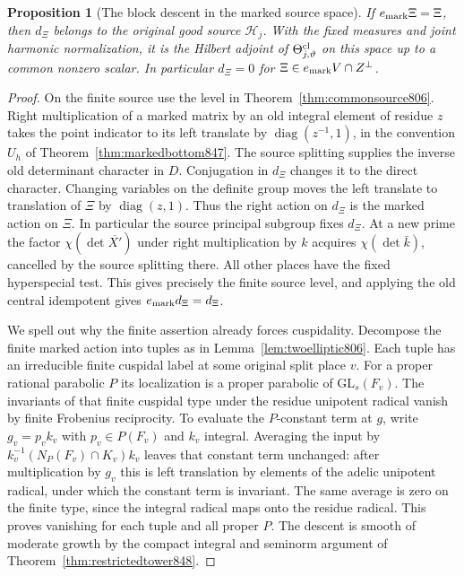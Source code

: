 \documentclass[a4paper,11pt]{article}
\newtheorem{proposition}{Proposition}[section]
\theoremstyle{definition}
\theoremstyle{remark}
\numberwithin{equation}{section}
\begin{document}
\begin{proposition}[The block descent in the marked source space]
\leavevmode\label{prop:actualadjoint849}
If \(e_{\rm mark}\Xi=\Xi\), then \(d_\Xi\) belongs to the
original good source \(\mathcal H_j\). With the fixed measures
and joint harmonic normalization, it is the Hilbert adjoint of
\(\Theta^{\rm cl}_{j,\vartheta}\) on this space up to a common
nonzero scalar. In particular \(d_\Xi=0\) for
\(\Xi\in e_{\rm mark}V\cap Z^\perp\).
\end{proposition}
\begin{proof}
On the finite source use the level in
Theorem~\ref{thm:commonsource806}. Right multiplication of a
marked matrix by an old integral element of residue \(z\)
takes the point indicator to its left translate by
\(\operatorname{diag}(z^{-1},1)\), in the convention \(U_h\)
of Theorem~\ref{thm:markedbottom847}. The source splitting
supplies the inverse old determinant character in \(D\).
Conjugation in \(d_\Xi\) changes it to the direct character.
Changing variables on the definite group moves the left
translate to translation of \(\Xi\) by
\(\operatorname{diag}(z,1)\). Thus the right action on
\(d_\Xi\) is the marked action on \(\Xi\). In particular the
source principal subgroup fixes \(d_\Xi\). At a new prime the
factor \(\chi(\det\overline{X'})\) under right multiplication
by \(k\) acquires \(\chi(\det\bar k)\), cancelled by the
source splitting there. All other places have the fixed
hyperspecial test. This gives precisely the finite source
level, and applying the old central idempotent gives
\(e_{\rm mark}d_\Xi=d_\Xi\).

We spell out why the finite assertion already forces
cuspidality. Decompose the finite marked action into tuples
as in Lemma~\ref{lem:twoelliptic806}. Each tuple has an
irreducible finite cuspidal label at some original split
place \(v\). For a proper rational parabolic \(P\) its
localization is a proper parabolic of \(\mathrm{GL}_s(F_v)\).
The invariants of that finite cuspidal type under the residue
unipotent radical vanish by finite Frobenius reciprocity. To
evaluate the \(P\)-constant term at \(g\), write \(g_v=p_vk_v\)
with \(p_v\in P(F_v)\) and \(k_v\) integral. Averaging the
input by \(k_v^{-1}(N_P(F_v)\cap K_v)k_v\) leaves that constant
term unchanged: after multiplication by \(g_v\) this is left
translation by elements of the adelic unipotent radical, under
which the constant term is invariant. The same average is zero
on the finite type, since the integral radical maps onto the
residue radical. This proves vanishing for each tuple and all
proper \(P\). The descent is smooth of moderate growth by the
compact integral and seminorm argument of
Theorem~\ref{thm:restrictedtower848}.


\end{proof}
\end{document}
